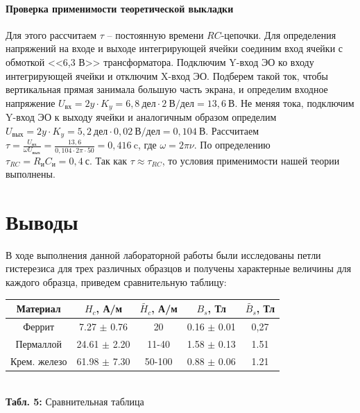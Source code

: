 \documentclass[12pt,a4paper]{scrartcl}
\begin{document}
\paragraph{Проверка применимости теоретической выкладки} \hfill

Для этого рассчитаем $\tau$ -- постоянную времени $ RC $-цепочки. Для определения напряжений на входе и выходе интегрирующей ячейки соединим вход ячейки с обмоткой <<6,3 В>> трансформатора. Подключим Y-вход ЭО ко входу интегрирующей ячейки и отключим X-вход ЭО. Подберем такой ток, чтобы вертикальная прямая занимала большую часть экрана, и определим входное напряжение $U_{\text{вх}}=2y\cdot K_y=6,8\ \text{дел} \cdot 2\ \text{В/дел}=13,6\ \text{В}$. Не меняя тока, подключим Y-вход ЭО к выходу ячейки и аналогичным образом определим $U_{\text{вых}}=2y\cdot K_y=5,2\ \text{дел} \cdot 0,02\ \text{В/дел}=0,104\ \text{В}$. Рассчитаем $\tau=\frac{U_{\text{вх}}}{\omega U_{\text{вых}}}=\frac{13,6}{0,104\cdot2\pi\cdot 50}=0,416\ \text{c}$, где $\omega=2\pi\nu$. По определению $\tau_{RC}=R_\text{и}C_\text{и}=0,4\ \text{с}$. Так как $\tau\approx\tau_{RC}$, то условия применимости нашей теории выполнены.

\section{Выводы}
В ходе выполнения данной лабораторной работы были исследованы петли гистерезиса для трех различных образцов и получены характерные величины для каждого образца, приведем сравнительную таблицу:

\begin{center}
	\begin{tabular}{|c|c|c|c|c|}
		\hline
		Материал     & $H_c$, А/м & $\tilde{H_c}$, А/м  & $B_s$, Тл & $\tilde{B_s}$, Тл \\ \hline
		Феррит       & 7.27 $\pm$ 0.76     & 20      & 0.16 $\pm$ 0.01    & 0,27               \\ \hline
		Пермаллой    & 24.61 $\pm$ 2.20      & 11-40    & 1.58 $\pm$ 0.13  & 1.51               \\ \hline
		Крем. железо & 61.98 $\pm$ 7.30      & 50-100     & 0.88  $\pm$ 0.06    & 1.21               \\ \hline
	\end{tabular}
	\\\textbf{Табл. 5:} Сравнительная таблица
\end{center}
\end{document}
